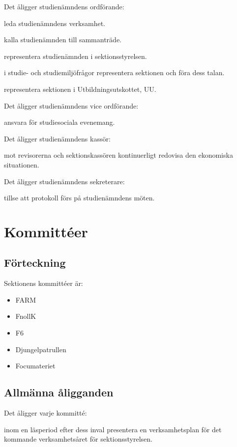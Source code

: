 \documentclass{styrdokument}
\begin{document}
\? Det åligger studienämndens ordförande:
\begin{aligganden}
    \item leda studienämndens verksamhet.
    \item kalla studienämnden till sammanträde.
    \item representera studienämnden i sektionsstyrelsen.
    \item i studie- och studiemiljöfrågor representera sektionen och föra dess talan.
    \item representera sektionen i Utbildningsutskottet, UU.
\end{aligganden}

\? Det åligger studienämndens vice ordförande:
\begin{aligganden}
    \item ansvara för studiesociala evenemang.
\end{aligganden}

\? Det åligger studienämndens kassör:
\begin{aligganden}
    \item mot revisorerna och sektionskassören kontinuerligt redovisa den ekonomiska situationen. 
\end{aligganden}

\? Det åligger studienämndens sekreterare:
\begin{aligganden}
     \item tillse att protokoll förs på studienämndens möten.
\end{aligganden}

\section{Kommittéer}
\subsection{Förteckning}
\? Sektionens kommittéer är:
\begin{itemize}
    \item FARM
	\item FnollK
	\item F6
	\item Djungelpatrullen
	\item Focumateriet
\end{itemize}

\subsection{Allmänna åligganden}
\? Det åligger varje kommitté:
\begin{aligganden}
    \item inom en läsperiod efter dess inval presentera en verksamhetsplan för det kommande verksamhetsåret för sektionsstyrelsen. 
\end{aligganden}
\end{document}

